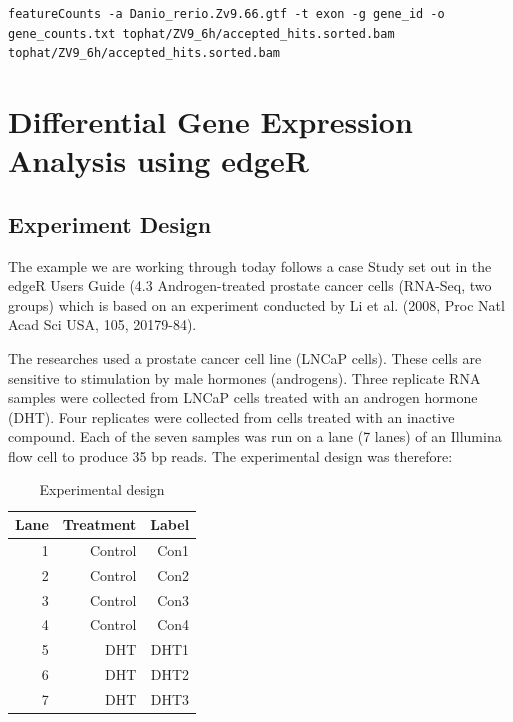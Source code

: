 \begin{steps}
\begin{lstlisting}[style=command_syntax]
featureCounts -a Danio_rerio.Zv9.66.gtf -t exon -g gene_id -o gene_counts.txt tophat/ZV9_6h/accepted_hits.sorted.bam tophat/ZV9_6h/accepted_hits.sorted.bam
\end{lstlisting}
\end{steps}


\newpage
\section{Differential Gene Expression Analysis using edgeR}

\subsection{Experiment Design}
The example we are working through today follows a case Study set out in the edgeR Users
Guide (4.3 Androgen-treated prostate cancer cells (RNA-Seq, two groups) which is based on
an experiment conducted by Li et al. (2008, Proc Natl Acad Sci USA, 105, 20179-84).

The researches used a prostate cancer cell line (LNCaP cells). These cells are sensitive
to stimulation by male hormones (androgens). Three replicate RNA samples were collected
from LNCaP cells treated with an androgen hormone (DHT). Four replicates were collected
from cells treated with an inactive compound. Each of the seven samples was run on a
lane (7 lanes) of an Illumina flow cell to produce 35 bp reads. The experimental design
was therefore:

\begin{table}[H]
  \centering
  \caption{Experimental design}
    \begin{tabular}{rrr}
    \toprule
    \textbf{Lane} & \textbf{Treatment} & \textbf{Label} \\
    \midrule
    1    & Control & Con1 \\
    2    & Control & Con2 \\
    3    & Control & Con3 \\
    4    & Control & Con4 \\
    5    & DHT & DHT1 \\
    6    & DHT & DHT2 \\
    7    & DHT & DHT3 \\

    \bottomrule
    \end{tabular}
  \label{tab:experimental_design}
\end{table}


